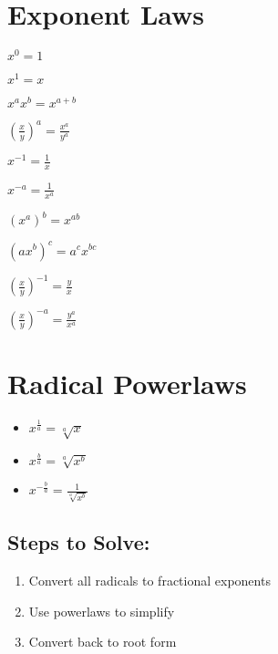 \documentclass{article}
\begin{document}

\section{Exponent Laws}
    
\begin{itemize}
    \begin{multicols}{3}
    \item $x^0 = 1$
    \item $x^1 = x$
    \item $x^ax^b = x^{a+b}$
    \item $\left(\frac{x}{y}\right)^a = \frac{x^a}{y^a}$
    \item $x^{-1} = \frac{1}{x}$
    \item $x^{-a} = \frac{1}{x^a}$
    \item $(x^a)^b = x^{ab}$
    \item $(ax^b)^c = a^cx^{bc}$
    \item $\left(\frac{x}{y}\right)^{-1} = \frac{y}{x}$
    \item $\left(\frac{x}{y}\right)^{-a} = \frac{y^a}{x^a}$
    \end{multicols}
\end{itemize}



\section{Radical Powerlaws}

\begin{itemize}
    \item $x^{\frac{1}{a}} = \sqrt[a]{x}$
    \item $x^{\frac{b}{a}} = \sqrt[a]{x^b}$
    \item $x^{-\frac{b}{a}} = \frac{1}{\sqrt[a]{x^b}}$
\end{itemize}

\subsection*{Steps to Solve:}
\begin{enumerate}
    \item Convert all radicals to fractional exponents
    \item Use powerlaws to simplify
    \item Convert back to root form
\end{enumerate}
\end{document}
